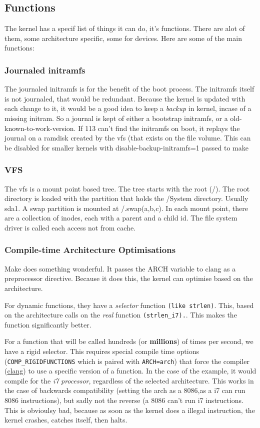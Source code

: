 \documentclass[12pt]{article}
\begin{document}
\subsection{Functions}
The kernel has a specif list of things it can do, it's functions. There are alot of them, some architecture specific, some for devices. Here are some of the main functions:
\subsubsection{Journaled initramfs}
The journaled initramfs is for the benefit of the boot process. The initramfs itself is not journaled, that would be redundant. Because the kernel is updated with each change to it, it would be a good idea to keep a \emph{backup} in kernel, incase of a missing initram. So a journal is kept of either a bootstrap initramfs, or a old-known-to-work-version. If 113 can't find the initramfs on boot, it replays the journal on a ramdisk created by the vfs (that exists on the file volume. This can be disabled for smaller kernels with disable-backup-initramfs=1 passed to make
\subsubsection{VFS}
The vfs is a mount point based tree. The tree starts with the root (/). The root directory is loaded with the partition that holds the /System directory. Usually sda1. A swap partition is mounted at /.swap(a,b,c). In each mount point, there are a collection of inodes, each with a parent and a child id. The file system driver is called each access not from cache.
\subsubsection{Compile-time Architecture Optimisations}
Make does something wonderful. It passes the ARCH variable to clang as a preprocessor directive. Because it does this, the kernel can optimise based on the architecture.

For dynamic functions, they have a \emph{selector} function \verb+(like strlen)+. This, based on the architecture calls on the \emph{real} function \verb+(strlen_i7).+. This makes the function significantly better.

For a function that will be called hundreds (or \textbf{millions}) of times per second, we have a rigid selector. This requires special compile time options (\verb+COMP_RIGIDFUNCTIONS+ which is paired with \verb+ARCH=arch+) that force the compiler (\underline{clang}) to use a specific version of a function. In the case of the example, it would compile for the \emph{i7} \emph{processor}, regardless of the selected architecture. This works in the case of backwards compatibility (setting the arch as a 8086,as a i7 can run 8086 instructions), but sadly not the reverse (a 8086 can't run i7 instructions. This is obvioulsy bad, because as soon as the kernel does a illegal instruction, the kernel crashes, catches itself, then halts.
\end{document}
